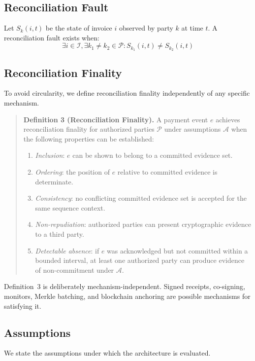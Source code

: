 \documentclass[journal]{IEEEtran}
\begin{document}
\subsection{Reconciliation Fault}
Let $S_k(i,t)$ be the state of invoice $i$ observed by party $k$ at time $t$. A reconciliation fault exists when:
\begin{equation}
\exists i \in \mathcal{I}, \exists k_1 \neq k_2 \in \mathcal{P}:
S_{k_1}(i,t) \neq S_{k_2}(i,t)
\end{equation}

\subsection{Reconciliation Finality}
To avoid circularity, we define reconciliation finality independently of any specific mechanism.

\begin{quote}
\textbf{Definition 3 (Reconciliation Finality).} A payment event $e$ achieves reconciliation finality for authorized parties $\mathcal{P}$ under assumptions $\mathcal{A}$ when the following properties can be established:
\begin{enumerate}[nosep,leftmargin=2em]
    \item \emph{Inclusion}: $e$ can be shown to belong to a committed evidence set.
    \item \emph{Ordering}: the position of $e$ relative to committed evidence is determinate.
    \item \emph{Consistency}: no conflicting committed evidence set is accepted for the same sequence context.
    \item \emph{Non-repudiation}: authorized parties can present cryptographic evidence to a third party.
    \item \emph{Detectable absence}: if $e$ was acknowledged but not committed within a bounded interval, at least one authorized party can produce evidence of non-commitment under $\mathcal{A}$.
\end{enumerate}
\end{quote}

Definition~3 is deliberately mechanism-independent. Signed receipts, co-signing, monitors, Merkle batching, and blockchain anchoring are possible mechanisms for satisfying it.

\subsection{Assumptions}
We state the assumptions under which the architecture is evaluated.
\end{document}
